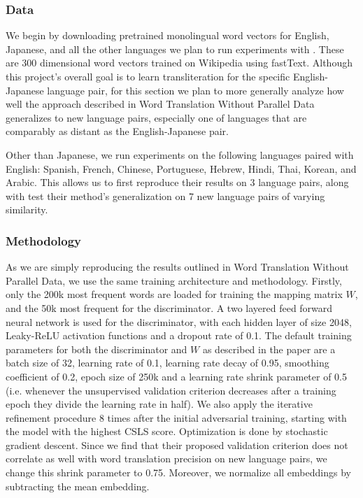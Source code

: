 \documentclass{article}
\begin{document}
\subsubsection*{Data}

We begin by downloading pretrained monolingual word vectors for English, Japanese,
and all the other languages we plan to run experiments with \cite{bojanowski2017enriching}.
These are 300 dimensional word vectors trained on Wikipedia using fastText.
Although this project's overall goal is to learn transliteration for the specific
English-Japanese language pair, for this section we plan to more generally analyze
how well the approach described in Word Translation Without Parallel Data generalizes
to new language pairs, especially one of languages that are comparably as distant as
the English-Japanese pair.

Other than Japanese, we run experiments on the following languages paired with English:
Spanish, French, Chinese, Portuguese, Hebrew, Hindi, Thai, Korean, and Arabic. This
allows us to first reproduce their results on 3 language pairs, along with test their
method's generalization on 7 new language pairs of varying similarity.

\subsubsection*{Methodology}

As we are simply reproducing the results outlined in Word Translation Without Parallel
Data, we use the same training architecture and methodology. Firstly, only the 200k
most frequent words are loaded for training the mapping matrix $W$, and the 50k most
frequent for the discriminator. A two layered feed forward neural network is used
for the discriminator, with each hidden layer of size 2048, Leaky-ReLU activation
functions and a dropout rate of 0.1. The default training parameters for
both the discriminator and $W$ as described in the paper are a
batch size of 32, learning rate of 0.1, learning rate decay of 0.95, smoothing
coefficient of 0.2, epoch size of 250k and a learning rate shrink parameter of 0.5
(i.e. whenever the unsupervised validation criterion decreases after a training epoch
they divide the learning rate in half). We also apply the iterative refinement
procedure 8 times after the initial adversarial training, starting with the model with
the highest CSLS score. Optimization is done by stochastic gradient descent.
Since we find that their proposed validation
criterion does not correlate as well with word translation precision on new language
pairs, we change this shrink parameter to 0.75. Moreover, we normalize all embeddings
by subtracting the mean embedding.
\end{document}

